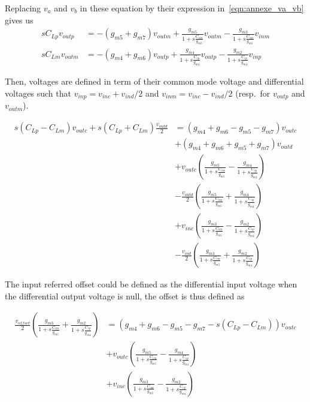 Replacing \(v_{a} \) and \(v_{b} \) in these equation by their expression in~\ref{eqn:annexe_va_vb} gives us
\begin{align}
    sC_{Lp} v_{outp} &= -(g_{m5}+g_{m7})v_{outm} + \frac{g_{m5}}{1+s\frac{C_{cm}}{g_{m5}}}v_{outm} - \frac{g_{m3}}{1+s\frac{C_{cm}}{g_{m5}}}v_{inm} \\
    sC_{Lm} v_{outm} &= -(g_{m4}+g_{m6})v_{outp} + \frac{g_{m4}}{1+s\frac{C_{cp}}{g_{m4}}}v_{outp} - \frac{g_{m2}}{1+s\frac{C_{cp}}{g_{m4}}}v_{inp}
\end{align}

Then, voltages are defined in term of their common mode voltage and differential voltages such that \(v_{inp} = v_{inc}+v_{ind}/2\) and \(v_{inm} = v_{inc}-v_{ind}/2\) (resp.\ for \(v_{outp}\) and \(v_{outm}\)).

\begin{align}
    s\left(C_{Lp}-C_{Lm}\right) v_{outc} + s\left(C_{Lp}+C_{Lm}\right) \frac{v_{outd}}{2} &= (g_{m4}+g_{m6}-g_{m5}-g_{m7}) v_{outc} \\
    &+ (g_{m4}+g_{m6}+g_{m5}+g_{m7}) v_{outd} \nonumber \\
    &+ v_{outc} \left(\frac{g_{m5}}{1+s\frac{C_{cm}}{g_{m5}}} - \frac{g_{m4}}{1+s\frac{C_{cp}}{g_{m4}}}\right) \nonumber \\
    &- \frac{v_{outd}}{2} \left(\frac{g_{m5}}{1+s\frac{C_{cm}}{g_{m5}}} + \frac{g_{m4}}{1+s\frac{C_{cp}}{g_{m4}}}\right) \nonumber \\
    &+ v_{inc} \left(\frac{g_{m3}}{1+s\frac{C_{cm}}{g_{m5}}} - \frac{g_{m2}}{1+s\frac{C_{cp}}{g_{m4}}}\right) \nonumber \\
    &- \frac{v_{ind}}{2} \left(\frac{g_{m3}}{1+s\frac{C_{cm}}{g_{m5}}} + \frac{g_{m2}}{1+s\frac{C_{cp}}{g_{m4}}}\right) \nonumber
\end{align}

The input referred offset could be defined as the differential input voltage when the differential output voltage is null, the offset is thus defined as

\begin{align}
    \frac{v_{offset}}{2} \left( \frac{g_{m3}}{1+s\frac{C_{cm}}{g_{m5}}} + \frac{g_{m2}}{1+s\frac{C_{cp}}{g_{m4}}} \right) &= \left( g_{m4}+g_{m6}-g_{m5}-g_{m7}-s\left(C_{Lp}-C_{Lm}\right) \right) v_{outc} \\
    &+ v_{outc} \left( \frac{g_{m5}}{1+s\frac{C_{cm}}{g_{m5}}} - \frac{g_{m4}}{1+s\frac{C_{cp}}{g_{m4}}} \right) \nonumber \\
    &+ v_{inc} \left( \frac{g_{m3}}{1+s\frac{C_{cm}}{g_{m5}}} - \frac{g_{m2}}{1+s\frac{C_{cp}}{g_{m4}}} \right) \nonumber
\end{align}

